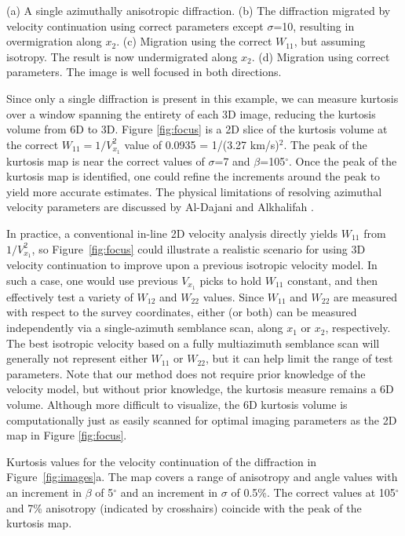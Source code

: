 {(a) A single azimuthally anisotropic diffraction. (b) The diffraction migrated by velocity continuation using correct parameters except $\sigma $=10, resulting in overmigration along $x_2$.  (c) Migration using the correct $W_{11}$, but assuming isotropy. The result is now undermigrated along $x_2$. (d) Migration using correct parameters.  The image is well focused in both directions.}

Since only a single diffraction is present in this example, we can measure kurtosis over a window spanning the entirety of each 3D image, reducing the kurtosis volume from 6D to 3D.  
Figure \ref{fig:focus} is a 2D slice of the kurtosis volume at the correct $W_{11}=1/V_{x_1}^2$ value of 0.0935 = 1/(3.27 km/s)$^2$.  
The peak of the kurtosis map is near the correct values of $\sigma $=7 and $\beta $=105$^{\circ }$.
Once the peak of the kurtosis map is identified, one could refine the increments around the peak to yield more accurate estimates.
The physical limitations of resolving azimuthal velocity parameters are discussed by Al-Dajani and Alkhalifah \cite{GEO65-01-02220231}. 

In practice, a conventional in-line 2D velocity analysis directly yields $W_{11}$ from $1/V_{x_1}^2$, so Figure~\ref{fig:focus} could illustrate a realistic scenario for using 3D velocity continuation to improve upon a previous isotropic velocity model.  
In such a case, one would use previous $V_{x_1}$ picks to hold $W_{11}$ constant, and then effectively test a variety of $W_{12}$ and $W_{22}$ values.  
Since $W_{11}$ and $W_{22}$ are measured with respect to the survey coordinates, either (or both) can be measured independently via a single-azimuth semblance scan, along $x_1$ or $x_2$, respectively. 
The best isotropic velocity based on a fully multiazimuth semblance scan will generally not represent either $W_{11}$ or $W_{22}$, but it can help limit the range of test parameters. 
Note that our method does not require prior knowledge of the velocity model, but without prior knowledge, the kurtosis measure remains a 6D volume.  
Although more difficult to visualize, the 6D kurtosis volume is computationally just as easily scanned for optimal imaging parameters as the 2D map in Figure \ref{fig:focus}.

{Kurtosis values for the velocity continuation of the diffraction in Figure~\ref{fig:images}a.  The map covers a range of anisotropy and angle values with an increment in $\beta $ of 5$^{\circ }$ and an increment in $\sigma $ of 0.5\%.  The correct values at 105$^{\circ }$ and 7\% anisotropy (indicated by crosshairs) coincide with the peak of the kurtosis map.}

